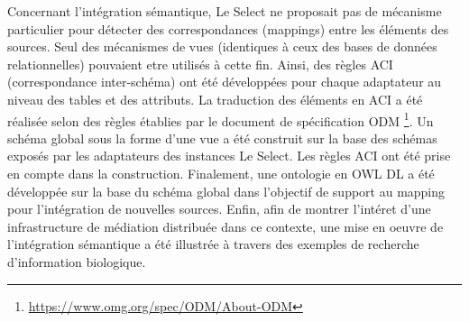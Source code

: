 Concernant l'intégration sémantique, Le Select ne proposait pas de mécanisme particulier pour détecter des correspondances (mappings) entre les éléments des sources. Seul des mécanismes de vues (identiques à ceux des bases de données relationnelles) pouvaient etre utilisés à cette fin.  Ainsi, des règles ACI (correspondance inter-schéma) ont été développées pour chaque adaptateur au niveau des tables et des attributs. La traduction des éléments en ACI a été réalisée selon des règles établies par le document de spécification ODM  \footnote{\url{https://www.omg.org/spec/ODM/About-ODM}}. Un schéma global sous la forme d'une vue a été construit sur la base des schémas exposés par les adaptateurs des instances Le Select. Les règles ACI ont été prise en compte dans la construction. Finalement,  une ontologie en OWL DL a été développée sur la base du schéma global dans l'objectif de support au mapping pour l'intégration de nouvelles sources.  Enfin, afin de montrer l'intéret d'une infrastructure de médiation distribuée dans ce contexte, une mise en oeuvre de l'intégration sémantique a été illustrée à travers des exemples de recherche d'information biologique. \\

